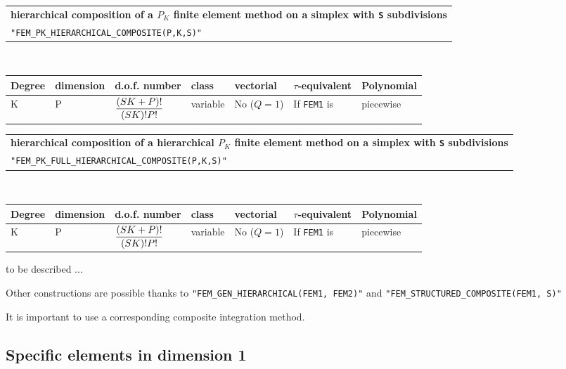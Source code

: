 \documentclass[11pt,a4paper]{article}
\begin{document}
\begin{center}
\begin{tabular}{|m{16.109cm}|} \hline 
{\bf hierarchical composition of a $P_K$ finite element method on a simplex with {\tt S} subdivisions}\\
{\tt "FEM\_PK\_HIERARCHICAL\_COMPOSITE(P,K,S)"} 
\end{tabular} \\ \vspace{-1pt} 
\begin{tabular}{|m{2cm}|m{2cm}|m{2.5cm}|m{1.5cm}|m{1.5cm}|m{2cm}|m{2cm}|} \hline 
Degree & dimension & d.o.f. number & class & vectorial & \mbox{$\tau$-equivalent} & Polynomial\\ \hline
\small K & \small P & \mbox{${\displaystyle \frac{\displaystyle (SK+P)!}{\displaystyle (SK)! P!}}$} & variable & No \mbox{($Q = 1$)} & If {\tt FEM1} is  & piecewise\\ \hline
\end{tabular}
\end{center}

\begin{center}
\begin{tabular}{|m{16.109cm}|} \hline 
{\bf hierarchical composition of a hierarchical $P_K$ finite element method on a simplex with {\tt S} subdivisions}\\
{\tt "FEM\_PK\_FULL\_HIERARCHICAL\_COMPOSITE(P,K,S)"} 
\end{tabular} \\ \vspace{-1pt} 
\begin{tabular}{|m{2cm}|m{2cm}|m{2.5cm}|m{1.5cm}|m{1.5cm}|m{2cm}|m{2cm}|} \hline 
Degree & dimension & d.o.f. number & class & vectorial & \mbox{$\tau$-equivalent} & Polynomial\\ \hline
\small K & \small P & \mbox{${\displaystyle \frac{\displaystyle (SK+P)!}{\displaystyle (SK)! P!}}$} & variable & No \mbox{($Q = 1$)} & If {\tt FEM1} is  & piecewise\\ \hline
\end{tabular}
\end{center}

to be described ...

Other constructions are possible thanks to {\tt "FEM\_GEN\_HIERARCHICAL(FEM1, FEM2)"} and {\tt "FEM\_STRUCTURED\_COMPOSITE(FEM1, S)"}

It is important to use a corresponding composite integration method.

\subsection{Specific elements in dimension 1}
\end{document}
